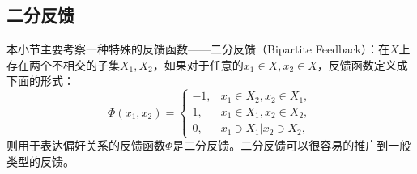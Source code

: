 \subsection{二分反馈}
本小节主要考察一种特殊的反馈函数——二分反馈（Bipartite Feedback）：在$X$上存在两个不相交的子集$X_1,X_2$，如果对于任意的$x_1\in X, x_2\in X$，反馈函数定义成下面的形式：
\begin{equation}
    \varPhi(x_1,x_2) = \left\{
        \begin{array}{cl}
          -1, &  x_1\in X_2, x_2\in X_1, \\
           1,  &  x_1\in X_1, x_2\in X_2, \\
           0,  &  x_1\ni X_1|x_2\ni X_2,
        \end{array}
    \right.
\end{equation}
则用于表达偏好关系的反馈函数$\varPhi$是二分反馈。二分反馈可以很容易的推广到一般类型的反馈。


